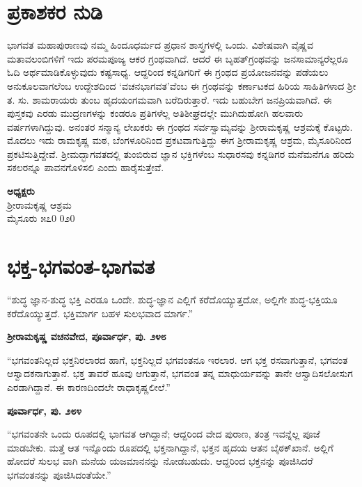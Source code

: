 
\chapter*{ಪ್ರಕಾಶಕರ ನುಡಿ}

ಭಾಗವತ ಮಹಾಪುರಾಣವು ನಮ್ಮ ಹಿಂದೂಧರ್ಮದ ಪ್ರಧಾನ ಶಾಸ್ತ್ರಗಳಲ್ಲಿ ಒಂದು. ವಿಶೇಷವಾಗಿ ವೈಷ್ಣವ ಮತಾವಲಂಬಿಗಳಿಗೆ ಇದು ಪರಮಪೂಜ್ಯ ಆಕರ ಗ್ರಂಥವಾಗಿದೆ. ಆದರೆ ಈ ಬೃಹತ್​ಗ್ರಂಥವನ್ನು ಜನಸಾಮಾನ್ಯರೆಲ್ಲರೂ ಓದಿ ಅರ್ಥಮಾಡಿಕೊಳ್ಳುವುದು ಕಷ್ಟಸಾಧ್ಯ. ಆದ್ದರಿಂದ ಕನ್ನಡಿಗರಿಗೆ ಈ ಗ್ರಂಥದ ಪ್ರಯೋಜನವನ್ನು ಪಡೆಯಲು ಅನುಕೂಲವಾಗಲೆಂಬ ಉದ್ದೇಶದಿಂದ ‘ವಚನಭಾಗವತ’ವೆಂಬ ಈ ಗ್ರಂಥವನ್ನು ಕರ್ಣಾಟಕದ ಹಿರಿಯ ಸಾಹಿತಿಗಳಾದ ಶ್ರೀ ತ. ಸು. ಶಾಮರಾಯರು ತುಂಬ ಹೃದಯಂಗಮವಾಗಿ ಬರೆದಿರುತ್ತಾರೆ. ಇದು ಬಹುಬೇಗ ಜನಪ್ರಿಯವಾಗಿದೆ. ಈ ಪುಸ್ತಕವು ಎರಡು ಮುದ್ರಣಗಳನ್ನು ಕಂಡರೂ ಪ್ರತಿಗಳೆಲ್ಲ ಅತಿಶೀಘ್ರದಲ್ಲೇ ಮುಗಿದುಹೋಗಿ ಹಲವಾರು ವರ್ಷಗಳಾಗಿದ್ದುವು. ಅನಂತರ ಸನ್ಮಾನ್ಯ ಲೇಖಕರು ಈ ಗ್ರಂಥದ ಸರ್ವಸ್ವಾಮ್ಯವನ್ನು ಶ್ರೀರಾಮಕೃಷ್ಣ ಆಶ್ರಮಕ್ಕೆ ಕೊಟ್ಟರು. ಮೊದಲು ಇದು ರಾಮಕೃಷ್ಣ ಮಠ, ಬೆಂಗಳೂರಿನಿಂದ ಪ್ರಕಟವಾಗುತ್ತಿದ್ದು ಈಗ ಶ್ರೀರಾಮಕೃಷ್ಣ ಆಶ್ರಮ, ಮೈಸೂರಿನಿಂದ ಪ್ರಕಟಿಸುತ್ತಿದ್ದೇವೆ. ಶ್ರೀಮದ್ಭಾಗವತದಲ್ಲಿ ತುಂಬಿರುವ ಜ್ಞಾನ ಭಕ್ತಿಗಳೆಂಬ ಸುಧಾರಸವು ಕನ್ನಡಿಗರ ಮನೆಮನೆಗೂ ಹರಿದು ಸಕಲರನ್ನೂ ಪಾವನಗೊಳಿಸಲಿ ಎಂದು ಹಾರೈಸುತ್ತೇವೆ.

\begin{flushright}
\textbf{ಅಧ್ಯಕ್ಷರು}\\ಶ್ರೀರಾಮಕೃಷ್ಣ ಆಶ್ರಮ\\ಮೈಸೂರು ೫೭0 0೨0
\end{flushright}

\chapter*{ಭಕ್ತ-ಭಗವಂತ-ಭಾಗವತ}

“ಶುದ್ಧ ಜ್ಞಾನ-ಶುದ್ಧ ಭಕ್ತಿ ಎರಡೂ ಒಂದೇ. ಶುದ್ಧ-ಜ್ಞಾನ ಎಲ್ಲಿಗೆ ಕರೆದೊಯ್ಯುತ್ತದೋ, ಅಲ್ಲಿಗೇ ಶುದ್ಧ-ಭಕ್ತಿಯೂ ಕರೆದೊಯ್ಯುತ್ತದೆ. ಭಕ್ತಿಮಾರ್ಗ ಬಹಳ ಸುಲಭವಾದ ಮಾರ್ಗ.”

\begin{flushright}
\textbf{ಶ್ರೀರಾಮಕೃಷ್ಣ ವಚನವೇದ, ಪೂರ್ವಾರ್ಧ, ಪು. ೨೪೮}
\end{flushright}

“ಭಗವಂತನಿಲ್ಲದೆ ಭಕ್ತನಿರಲಾರದ ಹಾಗೆ, ಭಕ್ತನಿಲ್ಲದೆ ಭಗವಂತನೂ ಇರಲಾರ. ಆಗ ಭಕ್ತ ರಸವಾಗುತ್ತಾನೆ, ಭಗವಂತ ಆಸ್ವಾದಕನಾಗುತ್ತಾನೆ. ಭಕ್ತ ತಾವರೆ ಹೂವು ಆಗುತ್ತಾನೆ, ಭಗವಂತ ತನ್ನ ಮಾಧುರ್ಯವನ್ನು ತಾನೇ ಆಸ್ವಾದಿಸಲೋಸುಗ ಎರಡಾಗಿದ್ದಾನೆ. ಈ ಕಾರಣದಿಂದಲೇ ರಾಧಾಕೃಷ್ಣಲೀಲೆ.”

\begin{flushright}
\textbf{ಪೂರ್ವಾರ್ಧ, ಪು. ೨೮೪}
\end{flushright}

“ಭಗವಂತನೇ ಒಂದು ರೂಪದಲ್ಲಿ ಭಾಗವತ ಆಗಿದ್ದಾನೆ; ಆದ್ದರಿಂದ ವೇದ ಪುರಾಣ, ತಂತ್ರ ಇವನ್ನೆಲ್ಲ ಪೂಜೆ ಮಾಡಬೇಕು. ಮತ್ತೆ ಆತ ಇನ್ನೊಂದು ರೂಪದಲ್ಲಿ ಭಕ್ತನಾಗಿದ್ದಾನೆ, ಭಕ್ತನ ಹೃದಯ ಆತನ ಬೈಠಕ್​ಖಾನೆ. ಅಲ್ಲಿಗೆ ಹೋದರೆ ಸುಲಭ ವಾಗಿ ಮನೆಯ ಯಜಮಾನನನ್ನು ನೋಡಬಹುದು. ಆದ್ದರಿಂದ ಭಕ್ತನನ್ನು ಪೂಜಿಸಿದರೆ ಭಗವಂತನನ್ನು ಪೂಜಿಸಿದಂತೆಯೇ.”

